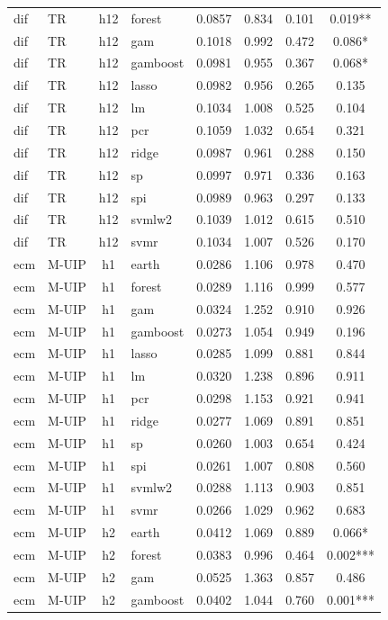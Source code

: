 \begin{ThreePartTable}
\begin{longtable}[t]{llclcccc}
dif & TR & h12 & forest & 0.0857 & 0.834 & 0.101 & 0.019**\\
dif & TR & h12 & gam & 0.1018 & 0.992 & 0.472 & 0.086*\\
dif & TR & h12 & gamboost & 0.0981 & 0.955 & 0.367 & 0.068*\\
dif & TR & h12 & lasso & 0.0982 & 0.956 & 0.265 & 0.135\\
dif & TR & h12 & lm & 0.1034 & 1.008 & 0.525 & 0.104\\
dif & TR & h12 & pcr & 0.1059 & 1.032 & 0.654 & 0.321\\
dif & TR & h12 & ridge & 0.0987 & 0.961 & 0.288 & 0.150\\
dif & TR & h12 & sp & 0.0997 & 0.971 & 0.336 & 0.163\\
dif & TR & h12 & spi & 0.0989 & 0.963 & 0.297 & 0.133\\
dif & TR & h12 & svmlw2 & 0.1039 & 1.012 & 0.615 & 0.510\\
dif & TR & h12 & svmr & 0.1034 & 1.007 & 0.526 & 0.170\\
\addlinespace
ecm & M-UIP & h1 & earth & 0.0286 & 1.106 & 0.978 & 0.470\\
ecm & M-UIP & h1 & forest & 0.0289 & 1.116 & 0.999 & 0.577\\
ecm & M-UIP & h1 & gam & 0.0324 & 1.252 & 0.910 & 0.926\\
ecm & M-UIP & h1 & gamboost & 0.0273 & 1.054 & 0.949 & 0.196\\
ecm & M-UIP & h1 & lasso & 0.0285 & 1.099 & 0.881 & 0.844\\
ecm & M-UIP & h1 & lm & 0.0320 & 1.238 & 0.896 & 0.911\\
ecm & M-UIP & h1 & pcr & 0.0298 & 1.153 & 0.921 & 0.941\\
ecm & M-UIP & h1 & ridge & 0.0277 & 1.069 & 0.891 & 0.851\\
ecm & M-UIP & h1 & sp & 0.0260 & 1.003 & 0.654 & 0.424\\
ecm & M-UIP & h1 & spi & 0.0261 & 1.007 & 0.808 & 0.560\\
ecm & M-UIP & h1 & svmlw2 & 0.0288 & 1.113 & 0.903 & 0.851\\
ecm & M-UIP & h1 & svmr & 0.0266 & 1.029 & 0.962 & 0.683\\
\addlinespace
ecm & M-UIP & h2 & earth & 0.0412 & 1.069 & 0.889 & 0.066*\\
ecm & M-UIP & h2 & forest & 0.0383 & 0.996 & 0.464 & 0.002***\\
ecm & M-UIP & h2 & gam & 0.0525 & 1.363 & 0.857 & 0.486\\
ecm & M-UIP & h2 & gamboost & 0.0402 & 1.044 & 0.760 & 0.001***\\

\end{longtable}
\end{ThreePartTable}
